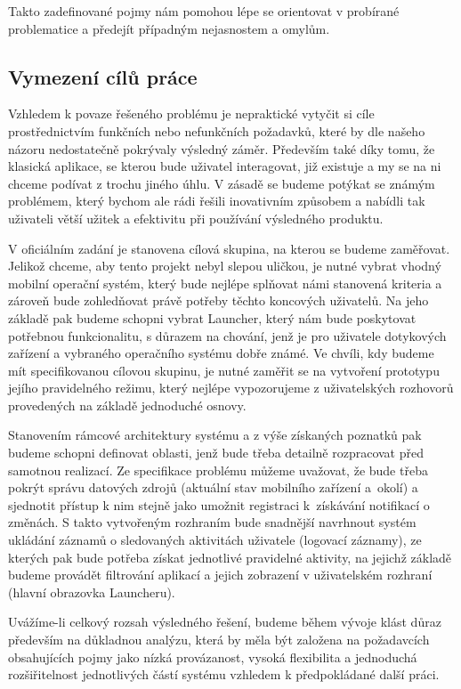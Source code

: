 \documentclass[thesis=M,czech]{FITthesis}[2012/06/26]
\begin{document}
\begin{introduction}
Takto zadefinované pojmy nám pomohou lépe se orientovat v probírané problematice a předejít případným nejasnostem a omylům.

\subsection{Vymezení cílů práce}
Vzhledem k povaze řešeného problému je nepraktické vytyčit si cíle prostřednictvím funkčních nebo nefunkčních požadavků, které by dle našeho názoru nedostatečně pokrývaly výsledný záměr. Především také díky tomu, že klasická aplikace, se kterou bude uživatel interagovat, již existuje a my se na ni chceme podívat z trochu jiného úhlu. V zásadě se budeme potýkat se známým problémem, který bychom ale rádi řešili inovativním způsobem a nabídli tak uživateli větší užitek a efektivitu při používání výsledného produktu.

V oficiálním zadání je stanovena cílová skupina, na kterou se budeme zaměřovat. Jelikož chceme, aby tento projekt nebyl slepou uličkou, je nutné vybrat vhodný mobilní operační systém, který bude nejlépe splňovat námi stanovená kriteria a zároveň bude zohledňovat právě potřeby těchto koncových uživatelů. Na jeho základě pak budeme schopni vybrat Launcher, který nám bude poskytovat potřebnou funkcionalitu, s důrazem na chování, jenž je pro uživatele dotykových zařízení a vybraného operačního systému dobře známé. Ve chvíli, kdy budeme mít specifikovanou cílovou skupinu, je nutné zaměřit se na vytvoření prototypu jejího pravidelného režimu, který nejlépe vypozorujeme z uživatelských rozhovorů provedených na základě jednoduché osnovy.

Stanovením rámcové architektury systému a z výše získaných poznatků pak budeme schopni definovat oblasti, jenž bude třeba detailně rozpracovat před samotnou realizací. Ze specifikace problému můžeme uvažovat, že bude třeba pokrýt správu datových zdrojů (aktuální stav mobilního zařízení a~okolí) a sjednotit přístup k nim stejně jako umožnit registraci k~získávání notifikací o změnách. S takto vytvořeným rozhraním bude snadnější navrhnout systém ukládání záznamů o sledovaných aktivitách uživatele (logovací záznamy), ze kterých pak bude potřeba získat jednotlivé pravidelné aktivity, na jejichž základě budeme provádět filtrování aplikací a jejich zobrazení v uživatelském rozhraní (hlavní obrazovka Launcheru). 

Uvážíme-li celkový rozsah výsledného řešení, budeme během vývoje klást důraz především na důkladnou analýzu, která by měla být založena na požadavcích obsahujících pojmy jako nízká provázanost, vysoká flexibilita a jednoduchá rozšiřitelnost jednotlivých částí systému vzhledem k předpokládané další práci.
\end{introduction}
\end{document}
